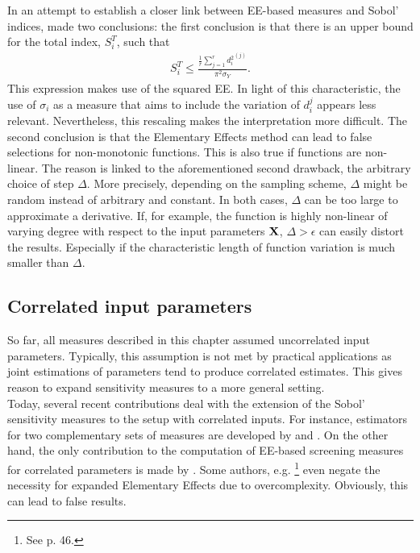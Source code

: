 In an attempt to establish a closer link between EE-based measures and Sobol' indices, \cite{kucherenko2009derivative} made two conclusions: the first conclusion is that there is an upper bound for the total index, $S_i^T$, such that
\begin{align}
S_i^T \leq \frac{\frac{1}{r} \sum_{j=1}^{r} {d_i^2}^{(j)}}{\pi^2 \sigma_Y}.
\end{align}
This expression makes use of the squared EE. In light of this characteristic, the use of $\sigma_i$ as a measure that aims to include the variation of $d_i^{j}$ appears less relevant. Nevertheless, this rescaling makes the interpretation more difficult. The second conclusion is that the Elementary Effects method can lead to false selections for non-monotonic functions. This is also true if functions are non-linear. The reason is linked to the aforementioned second drawback, the arbitrary choice of step $\Delta$. More precisely, depending on the sampling scheme, $\Delta$ might be random instead of arbitrary and constant. In both cases, $\Delta$ can be too large to approximate a derivative. If, for example, the function is highly non-linear of varying degree with respect to the input parameters $\bold{X}$, $\Delta > \epsilon$ can easily distort the results. Especially if the characteristic length of function variation is much smaller than $\Delta$.\\



\subsection{Correlated input parameters}

So far, all measures described in this chapter assumed uncorrelated input parameters. Typically, this assumption is not met by practical applications as joint estimations of parameters tend to produce correlated estimates. This gives reason to expand sensitivity measures to a more general setting.\\

\noindent
Today, several recent contributions deal with the extension of the Sobol' sensitivity measures to the setup with correlated inputs. For instance, estimators for two complementary sets of measures are developed by \cite{kucherenko2012estimation} and \cite{mara2015non}.
On the other hand, the only contribution to the computation of EE-based screening measures for correlated parameters is made by \cite{ge2017extending}. Some authors, e.g. \cite{Saltelli.2004}\footnote{See p. 46.} even negate the necessity for expanded Elementary Effects due to overcomplexity. Obviously, this can lead to false results.\\

